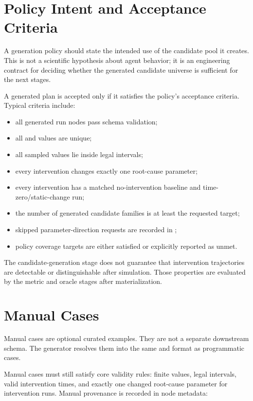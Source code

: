 \documentclass[11pt]{article}
\begin{document}
\section*{Policy Intent and Acceptance Criteria}

A generation policy should state the intended use of the candidate pool it creates.
This is not a scientific hypothesis about agent behavior; it is an engineering contract for deciding whether the generated candidate universe is sufficient for the next stages.

A generated plan is accepted only if it satisfies the policy's acceptance criteria.
Typical criteria include:

\begin{itemize}
\item all generated run nodes pass schema validation;
\item all  and  values are unique;
\item all sampled values lie inside  legal intervals;
\item every intervention changes exactly one root-cause parameter;
\item every intervention has a matched no-intervention baseline and time-zero/static-change run;
\item the number of generated candidate families is at least the requested target;
\item skipped parameter-direction requests are recorded in ;
\item policy coverage targets are either satisfied or explicitly reported as unmet.
\end{itemize}

The candidate-generation stage does not guarantee that intervention trajectories are detectable or distinguishable after simulation.
Those properties are evaluated by the metric and oracle stages after materialization.

\section*{Manual Cases}

Manual cases are optional curated examples.
They are not a separate downstream schema.
The generator resolves them into the same  and  format as programmatic cases.

Manual cases must still satisfy core validity rules: finite values, legal intervals, valid intervention times, and exactly one changed root-cause parameter for intervention runs.
Manual provenance is recorded in node metadata:
\end{document}
